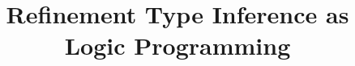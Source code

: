 \title{Refinement Type Inference as Logic Programming}

\ifdefined\DRAFT
 \pagestyle{fancyplain}
 \rhead{\thedate}
\fi

\author{
}
